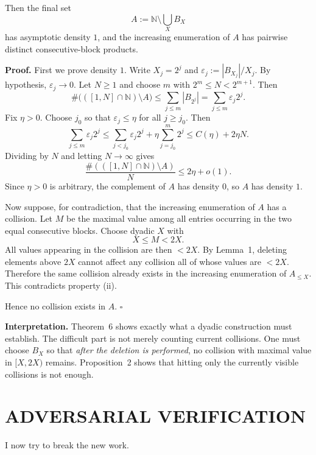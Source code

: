 Then the final set
\[
A:=\mathbb N\setminus \bigcup_X B_X
\]
has asymptotic density $1$, and the increasing enumeration of $A$ has pairwise distinct consecutive-block products.

\textbf{Proof.}
First we prove density $1$. Write $X_j=2^j$ and $\varepsilon_j:=|B_{X_j}|/X_j$. By hypothesis, $\varepsilon_j\to 0$. Let $N\ge 1$ and choose $m$ with $2^m\le N<2^{m+1}$. Then
\[
\#\bigl(([1,N]\cap \mathbb N)\setminus A\bigr)
\le \sum_{j\le m} |B_{2^j}|
=\sum_{j\le m} \varepsilon_j 2^j.
\]
Fix $\eta>0$. Choose $j_0$ so that $\varepsilon_j\le \eta$ for all $j\ge j_0$. Then
\[
\sum_{j\le m} \varepsilon_j 2^j
\le \sum_{j<j_0} \varepsilon_j 2^j + \eta \sum_{j=j_0}^{m}2^j
\le C(\eta)+2\eta N.
\]
Dividing by $N$ and letting $N\to\infty$ gives
\[
\frac{\#(([1,N]\cap \mathbb N)\setminus A)}{N}\le 2\eta+o(1).
\]
Since $\eta>0$ is arbitrary, the complement of $A$ has density $0$, so $A$ has density $1$.

Now suppose, for contradiction, that the increasing enumeration of $A$ has a collision. Let $M$ be the maximal value among all entries occurring in the two equal consecutive blocks. Choose dyadic $X$ with
\[
X\le M<2X.
\]
All values appearing in the collision are then $<2X$. By Lemma~1, deleting elements above $2X$ cannot affect any collision all of whose values are $<2X$. Therefore the same collision already exists in the increasing enumeration of $A_{\le X}$. This contradicts property (ii).

Hence no collision exists in $A$. \hfill$\square$

\medskip

\textbf{Interpretation.}
Theorem~6 shows exactly what a dyadic construction must establish. The difficult part is not merely counting current collisions. One must choose $B_X$ so that \emph{after the deletion is performed}, no collision with maximal value in $[X,2X)$ remains. Proposition~2 shows that hitting only the currently visible collisions is not enough.

\section{ADVERSARIAL VERIFICATION}

I now try to break the new work.

